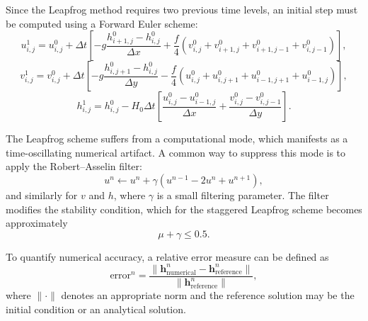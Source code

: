 Since the Leapfrog method requires two previous time levels, an initial step must be computed using a Forward Euler scheme:
\begin{equation}
u_{i,j}^{1} = u_{i,j}^{0} + \Delta t \left[
- g \frac{h_{i+1,j}^0 - h_{i,j}^0}{\Delta x}
+ \frac{f}{4} \left( v_{i,j}^0 + v_{i+1,j}^0 + v_{i+1,j-1}^0 + v_{i,j-1}^0 \right)
\right],
\end{equation}
\begin{equation}
v_{i,j}^{1} = v_{i,j}^{0} + \Delta t \left[
- g \frac{h_{i,j+1}^0 - h_{i,j}^0}{\Delta y}
- \frac{f}{4} \left( u_{i,j}^0 + u_{i,j+1}^0 + u_{i-1,j+1}^0 + u_{i-1,j}^0 \right)
\right],
\end{equation}
\begin{equation}
h_{i,j}^{1} = h_{i,j}^{0} - H_0 \Delta t \left[
\frac{u_{i,j}^0 - u_{i-1,j}^0}{\Delta x}
+ \frac{v_{i,j}^0 - v_{i,j-1}^0}{\Delta y}
\right].
\end{equation}

The Leapfrog scheme suffers from a computational mode, which manifests as a time-oscillating numerical artifact. A common way to suppress this mode is to apply the Robert–Asselin filter:
\begin{equation}
u^{n} \leftarrow u^{n} + \gamma \left( u^{n-1} - 2u^{n} + u^{n+1} \right),
\end{equation}
and similarly for $v$ and $h$, where $\gamma$ is a small filtering parameter. The filter modifies the stability condition, which for the staggered Leapfrog scheme becomes approximately
\begin{equation}
\mu + \gamma \leq 0.5.
\end{equation}

To quantify numerical accuracy, a relative error measure can be defined as
\begin{equation}
\text{error}^n = \frac{\|\mathbf{h}_{\text{numerical}}^n - \mathbf{h}_{\text{reference}}^n\|}{\|\mathbf{h}_{\text{reference}}^n\|},
\end{equation}
where $\|\cdot\|$ denotes an appropriate norm and the reference solution may be the initial condition or an analytical solution.